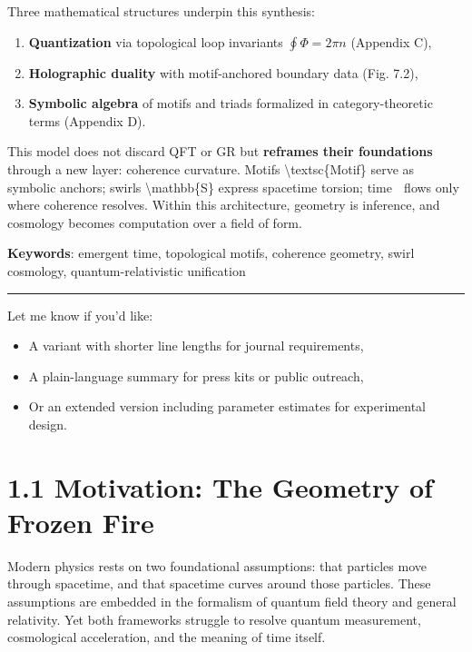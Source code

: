 \documentclass[
  11pt,
]{article}
\providecommand{\tightlist}{%
  \setlength{\itemsep}{0pt}\setlength{\parskip}{0pt}}
\begin{document}
Three mathematical structures underpin this synthesis:

\begin{enumerate}
\def\labelenumi{\arabic{enumi}.}
\tightlist
\item
  \textbf{Quantization} via topological loop invariants
  \(\oint \Phi = 2\pi n\) (Appendix C),
\item
  \textbf{Holographic duality} with motif-anchored boundary data (Fig.
  7.2),
\item
  \textbf{Symbolic algebra} of motifs and triads formalized in
  category-theoretic terms (Appendix D).
\end{enumerate}

This model does not discard QFT or GR but \textbf{reframes their
foundations} through a new layer: coherence curvature. Motifs
\textbackslash textsc\{Motif\} serve as symbolic anchors; swirls
\textbackslash mathbb\{S\} express spacetime torsion; time 🫧 flows only
where coherence resolves. Within this architecture, geometry is
inference, and cosmology becomes computation over a field of form.

\textbf{Keywords}: emergent time, topological motifs, coherence
geometry, swirl cosmology, quantum-relativistic unification

\begin{center}\rule{0.5\linewidth}{0.5pt}\end{center}

Let me know if you'd like:

\begin{itemize}
\tightlist
\item
  A variant with shorter line lengths for journal requirements,
\item
  A plain-language summary for press kits or public outreach,
\item
  Or an extended version including parameter estimates for experimental
  design.
\end{itemize}

\section{1.1 Motivation: The Geometry of Frozen
Fire}\label{motivation-the-geometry-of-frozen-fire}

Modern physics rests on two foundational assumptions: that particles
move through spacetime, and that spacetime curves around those
particles. These assumptions are embedded in the formalism of quantum
field theory and general relativity. Yet both frameworks struggle to
resolve quantum measurement, cosmological acceleration, and the meaning
of time itself.
\end{document}
